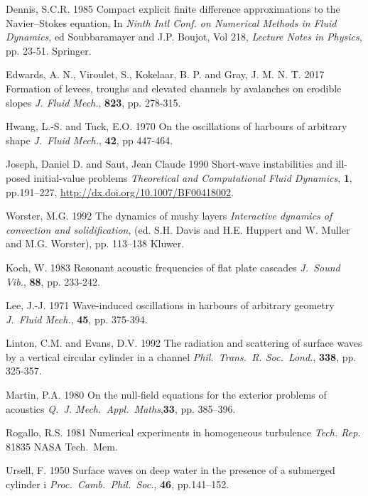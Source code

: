 \documentclass[lineno]{jfm}
\begin{document}
{{\begin{thebibliography}{99}
 {\sc  Dennis, S.C.R.} 1985 {Compact explicit finite difference approximations to the Navier--Stokes equation},  { In \it Ninth Intl Conf. on Numerical Methods in Fluid Dynamics},  {ed Soubbaramayer and J.P. Boujot},  {Vol 218}, {\it Lecture Notes in Physics}, pp. 23-51. Springer.

{\sc Edwards, A. N., Viroulet, S., Kokelaar, B. P. and Gray, J. M. N. T.} 2017 Formation of levees, troughs and elevated channels by avalanches on erodible slopes {\it J. Fluid Mech.}, {\bf 823}, pp. 278-315.

 {\sc Hwang,  L.-S.  and  Tuck, E.O.} 1970 On the oscillations of harbours of arbitrary shape {\it J.~Fluid Mech.}, {\bf42}, pp 447-464.

 {\sc Joseph, Daniel D. and Saut, Jean Claude} 1990 Short-wave instabilities and ill-posed initial-value problems {\it Theoretical and Computational Fluid Dynamics}, {\bf 1},  pp.191--227,  {\url{http://dx.doi.org/10.1007/BF00418002}}.

{ \sc  Worster, M.G.} 1992 The dynamics of mushy layers {\it Interactive dynamics of convection and solidification},
{(ed. S.H. Davis and H.E. Huppert and W. Muller and M.G. Worster)}, pp. 113--138 {Kluwer}.

{\sc Koch, W.} 1983 Resonant acoustic frequencies of flat plate cascades {\it J.~Sound Vib.}, {\bf 88}, pp. 233-242.

{\sc Lee,  J.-J.}  1971 Wave-induced oscillations in harbours of arbitrary geometry {\it J.~Fluid Mech.}, {\bf 45}, pp. 375-394.

 {\sc  Linton, C.M. and  Evans, D.V.} 1992 The radiation and scattering of surface waves by a vertical circular cylinder in a channel {\it Phil.\ Trans.\ R. Soc.\ Lond.}, {\bf 338}, pp. 325-357.

 {\sc  Martin, P.A.} 1980 On the null-field equations for the exterior problems of acoustics {\it Q.~J. Mech.\ Appl.\ Maths},{\bf 33}, pp. 385--396.

 {\sc Rogallo,  R.S.} 1981 Numerical experiments in homogeneous turbulence  { {\it Tech. Rep.} 81835}  {NASA Tech.\ Mem}.

{\sc  Ursell, F.} 1950 Surface waves on deep water in the presence of a submerged cylinder i {\it Proc.\ Camb.\ Phil.\ Soc.}, {\bf 46}, pp.141--152.


\end{thebibliography}}}
\end{document}
